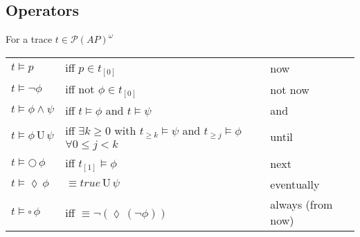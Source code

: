 \documentclass{article}
\def\P{\mathcal{P}}
\def\unt{\, \text{U} \,}
\def\nex{\bigcirc \,}
\def\evt{\lozenge  \,}
\def\alw{\square \,}
\begin{document}
\subsection{Operators}
For a trace $t\in\P(AP)^\omega$
\begin{center}
    \begin{tabular}{l l l}
        $t \vDash p$               & iff $p \in t_{[0]}$                                                                                       & now               \\
        $t \vDash\lnot \phi$       & iff not $\phi \in t_{[0]}$                                                                                & not now           \\
        $t \vDash \phi \land \psi$ & iff $t \vDash \phi$ and $t \vDash \psi$                                                                   & and               \\
        $t \vDash \phi \unt \psi$  & iff $\exists k \geq 0$ with  $t_{\geq k} \vDash \psi$ and $t_{\geq j} \vDash \phi$ $\forall 0 \leq j < k$ & until             \\
        $t \vDash \nex \phi$       & iff  $t_{[1]} \vDash \phi$                                                                                & next              \\
        $t \vDash \evt \phi$       & $\equiv true \unt \psi$                                                                                   & eventually        \\
        $t \vDash \alw \phi$       & iff  $\equiv \lnot (\evt (\lnot  \phi))$                                                                  & always (from now) \\
    \end{tabular}
\end{center}
\end{document}
